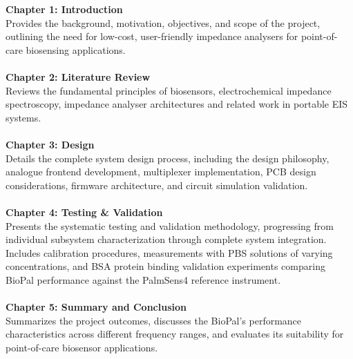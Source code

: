 \textbf{\large Chapter 1: Introduction} \\
Provides the background, motivation, objectives, and scope of the project, outlining the need for low-cost, user-friendly impedance analysers for point-of-care biosensing applications.
\\\\
\textbf{\large Chapter 2: Literature Review} \\
Reviews the fundamental principles of biosensors, electrochemical impedance spectroscopy, impedance analyser architectures and related work in portable EIS systems.
\\\\
\textbf{\large Chapter 3: Design} \\
Details the complete system design process, including the design philosophy, analogue frontend development, multiplexer implementation, PCB design considerations, firmware architecture, and circuit simulation validation.
\\\\
\textbf{\large Chapter 4: Testing \& Validation} \\
Presents the systematic testing and validation methodology, progressing from individual subsystem characterization through complete system integration. Includes calibration procedures, measurements with PBS solutions of varying concentrations, and BSA protein binding validation experiments comparing BioPal performance against the PalmSens4 reference instrument.
\\\\
\textbf{\large Chapter 5: Summary and Conclusion} \\
Summarizes the project outcomes, discusses the BioPal's performance characteristics across different frequency ranges, and evaluates its suitability for point-of-care biosensor applications.

